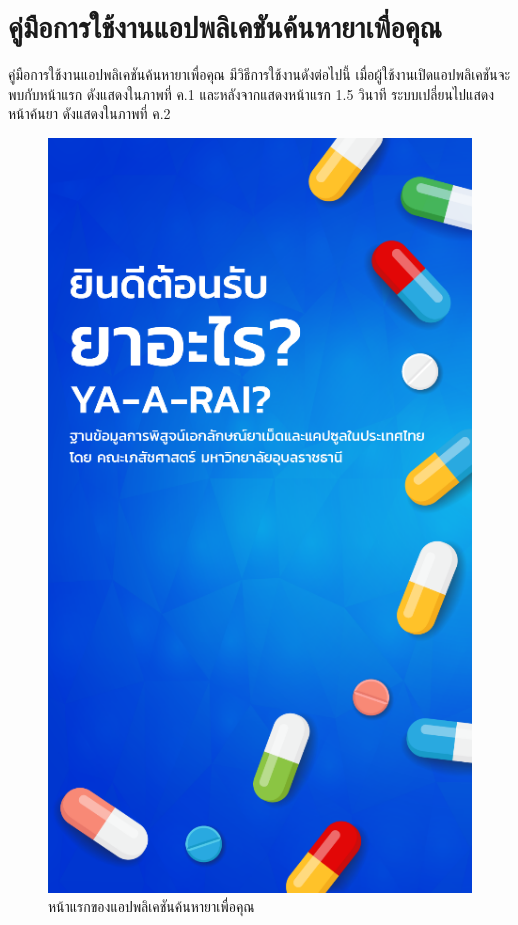 \chapter{คู่มือการใช้งานแอปพลิเคชันค้นหายาเพื่อคุณ}
คู่มือการใช้งานแอปพลิเคชันค้นหายาเพื่อคุณ 
มีวิธีการใช้งานดังต่อไปนี้ 
เมื่อผู้ใช้งานเปิดแอปพลิเคชันจะพบกับหน้าแรก 
ดังแสดงในภาพที่ ค.1 
และหลังจากแสดงหน้าแรก 1.5 วินาที 
ระบบเปลี่ยนไปแสดงหน้าค้นยา 
ดังแสดงในภาพที่ ค.2

\begin{figure}[H]
    \centering\includegraphics[scale=1.2]{Figures/7/14}
    \caption{หน้าแรกของแอปพลิเคชันค้นหายาเพื่อคุณ}
    \label{Fig:howto1}
\end{figure}


